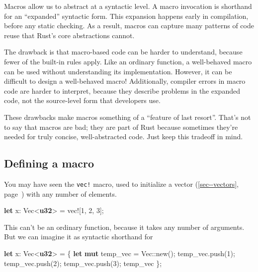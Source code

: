 \documentclass[a4paper,]{book}
\renewcommand*{\hyperref}[2][\ar]{%
  \def\ar{#2}%
  #2 (\autoref{#1}, page~\pageref{#1})}
\newenvironment{Shaded}{\begin{snugshade}}{\end{snugshade}}
\newcommand{\KeywordTok}[1]{\textcolor[rgb]{0.13,0.29,0.53}{\textbf{{#1}}}}
\newcommand{\DecValTok}[1]{\textcolor[rgb]{0.00,0.00,0.81}{{#1}}}
\newcommand{\OtherTok}[1]{\textcolor[rgb]{0.56,0.35,0.01}{{#1}}}
\newcommand{\NormalTok}[1]{{#1}}
\begin{document}
Macros allow us to abstract at a syntactic level. A macro invocation is
shorthand for an ``expanded'' syntactic form. This expansion happens
early in compilation, before any static checking. As a result, macros
can capture many patterns of code reuse that Rust's core abstractions
cannot.

The drawback is that macro-based code can be harder to understand,
because fewer of the built-in rules apply. Like an ordinary function, a
well-behaved macro can be used without understanding its implementation.
However, it can be difficult to design a well-behaved macro!
Additionally, compiler errors in macro code are harder to interpret,
because they describe problems in the expanded code, not the
source-level form that developers use.

These drawbacks make macros something of a ``feature of last resort''.
That's not to say that macros are bad; they are part of Rust because
sometimes they're needed for truly concise, well-abstracted code. Just
keep this tradeoff in mind.

\subsection{Defining a macro}\label{defining-a-macro}

You may have seen the \texttt{vec!} macro, used to initialize a
\hyperref[sec--vectors]{vector} with any number of elements.

\begin{Shaded}
\begin{Highlighting}[]
\KeywordTok{let} \NormalTok{x: Vec<}\KeywordTok{u32}\NormalTok{> = }\OtherTok{vec!}\NormalTok{[}\DecValTok{1}\NormalTok{, }\DecValTok{2}\NormalTok{, }\DecValTok{3}\NormalTok{];}
\end{Highlighting}
\end{Shaded}

This can't be an ordinary function, because it takes any number of
arguments. But we can imagine it as syntactic shorthand for

\begin{Shaded}
\begin{Highlighting}[]
\KeywordTok{let} \NormalTok{x: Vec<}\KeywordTok{u32}\NormalTok{> = \{}
    \KeywordTok{let} \KeywordTok{mut} \NormalTok{temp_vec = Vec::new();}
    \NormalTok{temp_vec.push(}\DecValTok{1}\NormalTok{);}
    \NormalTok{temp_vec.push(}\DecValTok{2}\NormalTok{);}
    \NormalTok{temp_vec.push(}\DecValTok{3}\NormalTok{);}
    \NormalTok{temp_vec}
\NormalTok{\};}
\end{Highlighting}
\end{Shaded}
\end{document}
